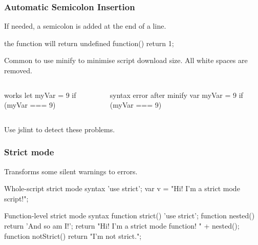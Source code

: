 \documentclass[aspectratio=1610]{beamer}
\begin{document}
\begin{frame}[fragile]
  \frametitle{Automatic Semicolon Insertion}
  If needed, a semicolon is added at the end of a line.
\begin{CodeBox}{the function will return undefined}
  function() { return
  1; }
\end{CodeBox}

\vspace{4mm}
Common to use minify to minimise script download size. All white spaces are removed.
\begin{columns}[onlytextwidth]
  \begin{column}{0.35\textwidth}
\begin{CodeBox}{works}
  let myVar = 9
  if (myVar === 9) {
  }
\end{CodeBox}
  \end{column}
  \begin{column}{0.65\textwidth}
\begin{CodeBox}{syntax error after minify}
  var myVar = 9 if (myVar === 9) {}
\end{CodeBox}
  \end{column}
  \begin{column}{0.3\textwidth}  \end{column}
\end{columns}%

\vspace{4mm}
Use jslint to detect these problems.
\end{frame}

\begin{frame}[fragile]
  \frametitle{Strict mode}
Transforms some silent warnings to errors.

\begin{CodeBox}{Whole-script strict mode syntax}
'use strict';
var v = "Hi! I'm a strict mode script!";
\end{CodeBox}

\begin{CodeBox}{Function-level strict mode syntax}
function strict() {
  'use strict';
  function nested() { return 'And so am I!'; }
  return "Hi!  I'm a strict mode function!  " + nested();
}
function notStrict() { return "I'm not strict."; }
\end{CodeBox}


\end{frame}


\end{document}
